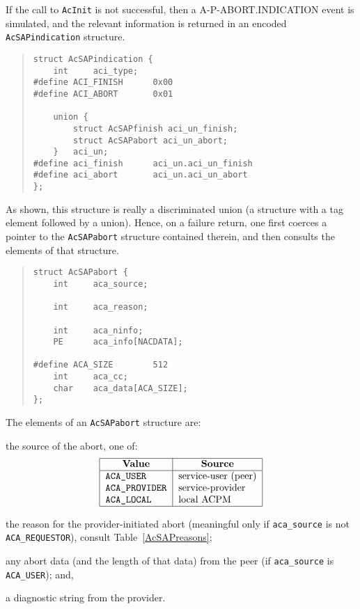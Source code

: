 If the call to \verb"AcInit" is not successful,
then a {\sf A-P-ABORT.INDICATION\/} event is simulated,
and the relevant information is returned in an encoded
\verb"AcSAPindication" structure.\label{AcSAPindication}
\begin{quote}\small\begin{verbatim}
struct AcSAPindication {
    int     aci_type;
#define ACI_FINISH      0x00
#define ACI_ABORT       0x01

    union {
        struct AcSAPfinish aci_un_finish;
        struct AcSAPabort aci_un_abort;
    }   aci_un;
#define aci_finish      aci_un.aci_un_finish
#define aci_abort       aci_un.aci_un_abort
};
\end{verbatim}\end{quote}
As shown, this structure is really a discriminated union
(a structure with a tag element followed by a union).
Hence, on a failure return,
one first coerces a pointer to the \verb"AcSAPabort" structure contained
therein,
and then consults the elements of that structure.
\begin{quote}\small\begin{verbatim}
struct AcSAPabort {
    int     aca_source;

    int     aca_reason;

    int     aca_ninfo;
    PE      aca_info[NACDATA];

#define ACA_SIZE        512
    int     aca_cc;
    char    aca_data[ACA_SIZE];
};
\end{verbatim}\end{quote}
The elements of an \verb"AcSAPabort" structure are:
\begin{describe}
\item[\verb"aca\_source":] the source of the abort, one of:
\[\begin{tabular}{|l|l|}
\hline
    \multicolumn{1}{|c|}{\bf Value}&
		\multicolumn{1}{c|}{\bf Source}\\
\hline
    \tt ACA\_USER&		service-user (peer)\\
    \tt ACA\_PROVIDER&		service-provider\\
    \tt ACA\_LOCAL&		local ACPM\\
\hline
\end{tabular}\]

\item[\verb"aca\_reason":] the reason for the provider-initiated abort
(meaningful only if \verb"aca_source" is not \verb"ACA_REQUESTOR"),
consult Table~\ref{AcSAPreasons};

\item[\verb"aca\_info"/\verb"aca\_ninfo":] any abort data
(and the length of that data) from the peer
(if \verb"aca_source" is \verb"ACA_USER");
and,

\item[\verb"aca\_data"/\verb"aca\_cc":] a diagnostic string from the provider.
\end{describe}
